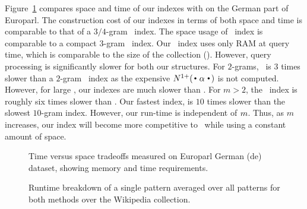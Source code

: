 

Figure~\ref{fig:spacetime} compares space and time of our indexes with \SRILM on the German part of Europarl.
The construction cost of our indexes in terms of both space and time is comparable to that of 
a $3/4$-gram \SRILM\ index. The space usage of \dualCST\ index is comparable to
a compact $3$-gram \SRILM\ index. Our \singleCST\ index uses only  RAM
at query time, which is comparable to the size of the collection ().
However, query processing is significantly slower for both our structures.
For $2$-grams, \dualCST\ is $3$ times slower than a $2$-gram \SRILM\ index as
the expensive $\nlplus{\dotpatdot}$ is not computed. However, for large \ngrams,
our indexes are much slower than \SRILM. For $m>2$, 
the \dualCST\ index is roughly six times slower than \singleCST. Our fastest
index, is $10$ times slower than the slowest \SRILM $10$-gram index. However,
our run-time is independent of $m$. Thus, as $m$ increases, our index
will become more competitive to \SRILM\ while using a constant amount of space.


\begin{figure}[tb]

\caption{Time versus space tradeoffs measured on Europarl German (de) dataset, 
showing memory and time requirements.}
\label{fig:spacetime}
\end{figure}


\begin{figure}[!tb]

\caption{Runtime breakdown of a single pattern averaged over all patterns for both methods over the Wikipedia collection.}
\label{fig:wikitime}
\end{figure}

